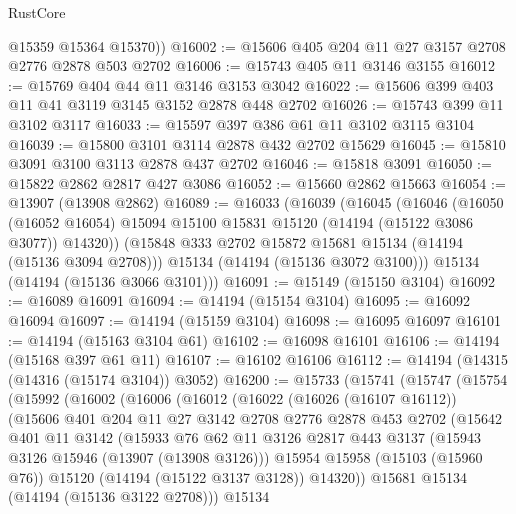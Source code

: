 \begin{lexlean}{RustCore}
\begin{coremodule}
        @15359
        @15364
        @15370))
@16002 := @15606 @405 @204 @11 @27 @3157 @2708 @2776 @2878 @503 @2702
@16006 := @15743 @405 @11 @3146 @3155
@16012 := @15769 @404 @44 @11 @3146 @3153 @3042
@16022 := @15606 @399 @403 @11 @41 @3119 @3145 @3152 @2878 @448 @2702
@16026 := @15743 @399 @11 @3102 @3117
@16033 := @15597 @397 @386 @61 @11 @3102 @3115 @3104
@16039 := @15800 @3101 @3114 @2878 @432 @2702 @15629
@16045 := @15810 @3091 @3100 @3113 @2878 @437 @2702
@16046 := @15818 @3091
@16050 := @15822 @2862 @2817 @427 @3086
@16052 := @15660 @2862 @15663
@16054 := @13907 (@13908 @2862)
@16089 := @16033
    (@16039
      (@16045
        (@16046
          (@16050 (@16052 @16054) @15094 @15100 @15831 @15120 (@14194 (@15122 @3086 @3077)) @14320))
        (@15848 @333 @2702 @15872 @15681 @15134 (@14194 (@15136 @3094 @2708)))
        @15134
        (@14194 (@15136 @3072 @3100)))
      @15134
      (@14194 (@15136 @3066 @3101)))
@16091 := @15149 (@15150 @3104)
@16092 := @16089 @16091
@16094 := @14194 (@15154 @3104)
@16095 := @16092 @16094
@16097 := @14194 (@15159 @3104)
@16098 := @16095 @16097
@16101 := @14194 (@15163 @3104 @61)
@16102 := @16098 @16101
@16106 := @14194 (@15168 @397 @61 @11)
@16107 := @16102 @16106
@16112 := @14194 (@14315 (@14316 (@15174 @3104)) @3052)
@16200 := @15733
    (@15741
      (@15747
        (@15754
          (@15992
            (@16002
              (@16006
                (@16012
                  (@16022
                    (@16026 (@16107 @16112))
                    (@15606
                      @401
                      @204
                      @11
                      @27
                      @3142
                      @2708
                      @2776
                      @2878
                      @453
                      @2702
                      (@15642
                        @401
                        @11
                        @3142
                        (@15933
                          @76
                          @62
                          @11
                          @3126
                          @2817
                          @443
                          @3137
                          (@15943 @3126 @15946 (@13907 (@13908 @3126)))
                          @15954
                          @15958
                          (@15103 (@15960 @76))
                          @15120
                          (@14194 (@15122 @3137 @3128))
                          @14320))
                      @15681
                      @15134
                      (@14194 (@15136 @3122 @2708)))
                    @15134

\end{coremodule}
\end{lexlean}
